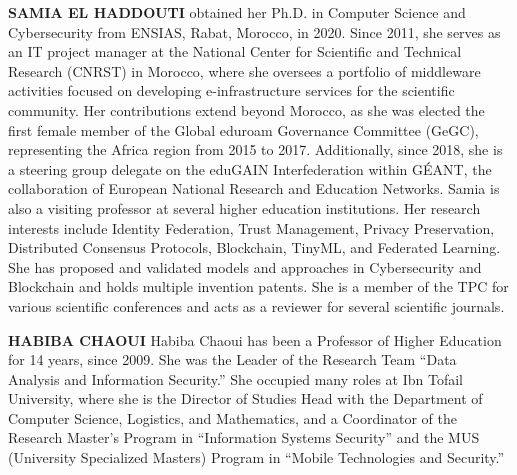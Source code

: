 \documentclass{ieeeaccess}
\theoremstyle{definition}
\begin{document}
\begin{IEEEbiographynophoto}{\textbf{SAMIA EL HADDOUTI}}
obtained her Ph.D. in Computer Science and Cybersecurity from ENSIAS, Rabat, Morocco, in 2020. Since 2011, she serves as an IT project manager at the National Center for Scientific and Technical Research (CNRST) in Morocco, where she oversees a portfolio of middleware activities focused on developing e-infrastructure services for the scientific community. Her contributions extend beyond Morocco, as she was elected the first female member of the Global eduroam Governance Committee (GeGC), representing the Africa region from 2015 to 2017. Additionally, since 2018, she is a steering group delegate on the eduGAIN Interfederation within GÉANT, the collaboration of European National Research and Education Networks. Samia is also a visiting professor at several higher education institutions. Her research interests include Identity Federation, Trust Management, Privacy Preservation, Distributed Consensus Protocols, Blockchain, TinyML, and Federated Learning. She has proposed and validated models and approaches in Cybersecurity and Blockchain and holds multiple invention patents. She is a member of the TPC for various scientific conferences and acts as a reviewer for several scientific journals.
\end{IEEEbiographynophoto}


\begin{IEEEbiographynophoto}{\textbf{HABIBA CHAOUI}}
Habiba Chaoui has been a Professor of Higher Education for 14 years, since 2009. She was the Leader of the Research Team “Data Analysis and Information Security.” She occupied many roles at Ibn Tofail University, where she is the Director of Studies Head with the Department of Computer Science, Logistics, and Mathematics, and a Coordinator of the Research Master’s Program in “Information Systems Security” and the MUS (University Specialized Masters) Program in “Mobile Technologies and Security.”
\end{IEEEbiographynophoto}

\EOD
\end{document}
